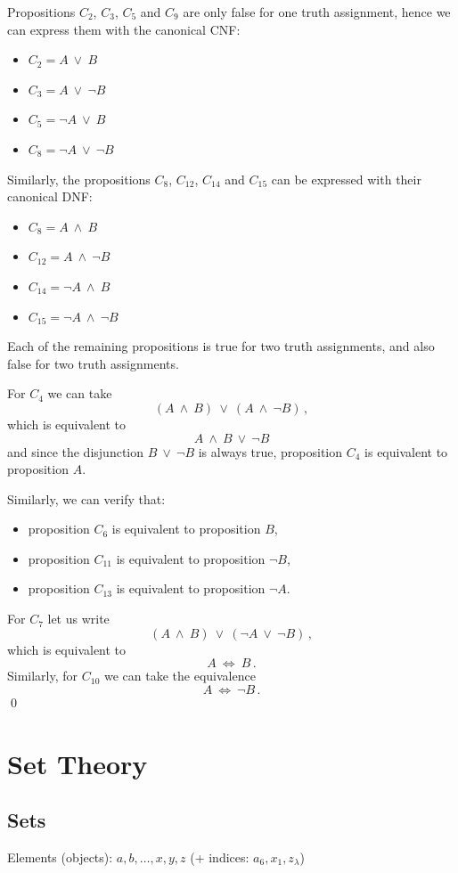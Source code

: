 \documentclass[11pt,paper=b5,footinclude,headinclude]{scrbook} %
\def\ali {{~\vee~}}
\def\inn {{~\wedge~}}
\def\cee {{~\Leftrightarrow~}}
\theoremstyle{remark}
\theoremstyle{definition} %
\begin{document}
Propositions $C_2$, $C_3$, $C_5$ and $C_9$ are only false for one truth assignment, hence we can express them with the canonical
CNF:
\begin{itemize}
	\item $C_2 = A\ali B$
	\item $C_3 = A\ali \neg B$
	\item $C_5 = \neg A\ali B$
	\item $C_8 = \neg A\ali \neg B$
\end{itemize}
Similarly, the propositions $C_{8}$, $C_{12}$, $C_{14}$ and $C_{15}$ can be expressed with their canonical DNF:
\begin{itemize}
	\item $C_8 = A\inn B$
	\item $C_{12} = A\inn\neg B$
	\item $C_{14} = \neg A\inn B$
	\item $C_{15} = \neg A\inn\neg B$
\end{itemize}
Each of the remaining propositions is true for two truth assignments, and also false for two truth assignments.

For $C_4$ we can take $$(A\inn B) \ali (A\inn \neg B)\,,$$
which is equivalent to
$$A\inn B \ali \neg B$$
and since the disjunction $B \ali \neg B$ is always true, proposition $C_4$ is equivalent to proposition $A$.

Similarly, we can verify that:
\begin{itemize}
	\item  proposition $C_6$ is equivalent to proposition $B$,
	\item  proposition $C_{11}$ is equivalent to proposition $\neg B$,
	\item  proposition $C_{13}$ is equivalent to proposition $\neg A$.
\end{itemize}
For $C_7$ let us write
$$(A\inn B) \ali (\neg A\ali \neg B)\,,$$
which is equivalent to
$$A\cee B\,.$$
Similarly, for $C_{10}$ we can take the equivalence
$$A\cee \neg B\,.$$
\qed

\chapter{Set Theory}

\section{Sets}

Elements (objects): $a,b,\ldots, x,y,z$ (+ indices: $a_6, x_1, z_\lambda$)
\end{document}
